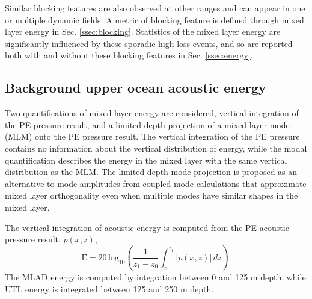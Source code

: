 \documentclass[preprint,NumberedRefs]{JASA}
\begin{document}
Similar blocking features are also observed at other ranges and can appear in one or multiple dynamic fields. A metric of blocking feature is defined through mixed layer energy in Sec. \ref{ssec:blocking}. Statistics of the mixed layer energy are significantly influenced by these sporadic high loss events, and so are reported both with and without these blocking features in Sec. \ref{ssec:energy}.

\subsection{Background upper ocean acoustic energy}\label{ssec:bg}
Two quantifications of mixed layer energy are considered, vertical integration of the PE pressure result, and a limited depth projection of a mixed layer mode (MLM) onto the PE pressure result. The vertical integration of the PE pressure contains no information about the vertical distribution of energy, while the modal quantification describes the energy in the mixed layer with the same vertical distribution as the MLM. The limited depth mode projection is proposed as an alternative to mode amplitudes from coupled mode calculations that approximate mixed layer orthogonality even when multiple modes have similar shapes in the mixed layer.

The vertical integration of acoustic energy is computed from the PE acoustic pressure result, $p(x, z)$,
\begin{equation}
        \textrm{E} = 20 \, \textrm{log}_{10} \left( \frac{1}{z_1 - z_0} \int^{z_1}_{z_0} \left| p(x, z) \right| \,  dz \right).
    \label{eq:int_eng}
\end{equation}
The MLAD energy is computed by integration between 0 and 125 m depth, while UTL energy is integrated between 125 and 250 m depth.
\end{document}

